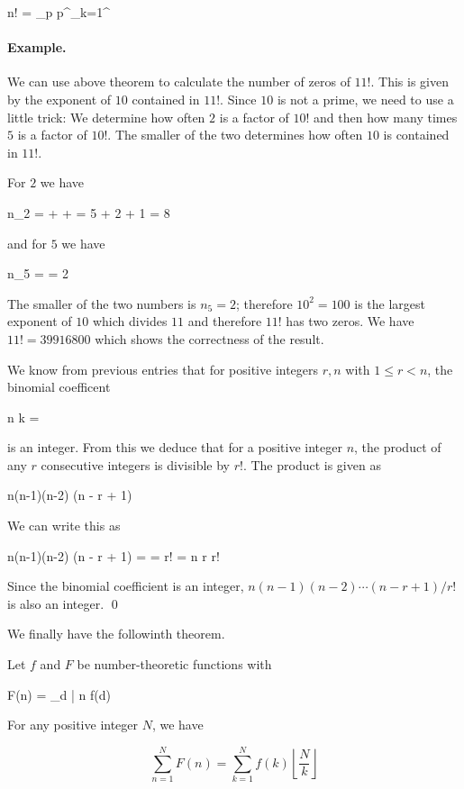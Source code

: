 \bee
n! = \prod_p p^{\sum_{k=1}^\infty \left\lfloor {} \right\rfloor}
\eee

\paragraph{Example.} We can use above theorem to calculate the number of zeros of $11!$. This is given by the exponent of $10$ contained in $11!$. Since $10$ is not a prime, we need to use a little trick: We determine how often $2$ is a factor of $10!$ and then how many times $5$ is a factor of $10!$. The smaller of the two determines how often $10$ is contained in $11!$.

For $2$ we have

\bee
n_2 = \left\lfloor {} \right\rfloor + \left\lfloor {} \right\rfloor + \left\lfloor {} \right\rfloor = 5 + 2 + 1 = 8
\eee

and for $5$ we have

\bee
n_5 = \left\lfloor {} \right\rfloor = 2
\eee

The smaller of the two numbers is $n_5 = 2$; therefore $10^2 = 100$ is the largest exponent of $10$ which divides $11$ and therefore $11!$ has two zeros. We have $11! = 39916800$ which shows the correctness of the result.

We know from previous entries that for positive integers $r,n$ with $1 \leq r < n$, the binomial coefficent

\bee
{n \choose k} = 
\eee

is an integer. From this we deduce that for a positive integer $n$, the product of any $r$ consecutive integers is divisible by $r!$. The product is given as

\bee
n(n-1)(n-2) \cdots (n - r + 1)
\eee

We can write this as

\bee
n(n-1)(n-2) \cdots (n - r + 1) =  = r! = {n \choose r} r!
\eee

Since the binomial coefficient is an integer, $n(n-1)(n-2) \cdots (n - r + 1) / r!$ is also an integer. \qed

We finally have the followinth theorem.

\begin{theorem}
    Let $f$ and $F$ be number-theoretic functions with

    \bee
        F(n) = \sum_{d | n} f(d)
    \eee

    For any positive integer $N$, we have

    \begin{equation}
        \sum_{n=1}^N F(n) = \sum_{k=1}^N f(k) \left\lfloor \frac{N}{k} \right\rfloor
    \end{equation}

\end{theorem}

